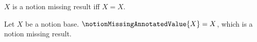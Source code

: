 

\begin{definition}\label{notion_missing_result}
    $X$ is a notion missing result iff $X=X$.
\end{definition}

\begin{definition}\label{notion_missing_annotated_value}
    Let $X$ be a notion base.
    $\notionMissingAnnotatedValue{X}=X$, which is a notion missing result.
\end{definition}
